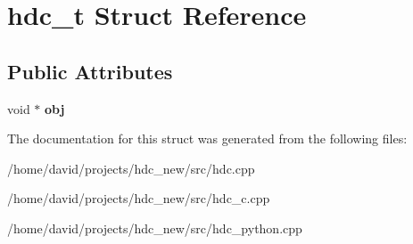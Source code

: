 \hypertarget{structhdc__t}{}\section{hdc\+\_\+t Struct Reference}
\label{structhdc__t}
\subsection*{Public Attributes}
\begin{DoxyCompactItemize}
\item 
void $\ast$ {\bfseries obj}\hypertarget{structhdc__t_af998aa25515681a151a201355fc9e108}{}\label{structhdc__t_af998aa25515681a151a201355fc9e108}

\end{DoxyCompactItemize}


The documentation for this struct was generated from the following files\+:\begin{DoxyCompactItemize}
\item 
/home/david/projects/hdc\+\_\+new/src/hdc.\+cpp\item 
/home/david/projects/hdc\+\_\+new/src/hdc\+\_\+c.\+cpp\item 
/home/david/projects/hdc\+\_\+new/src/hdc\+\_\+python.\+cpp\end{DoxyCompactItemize}
